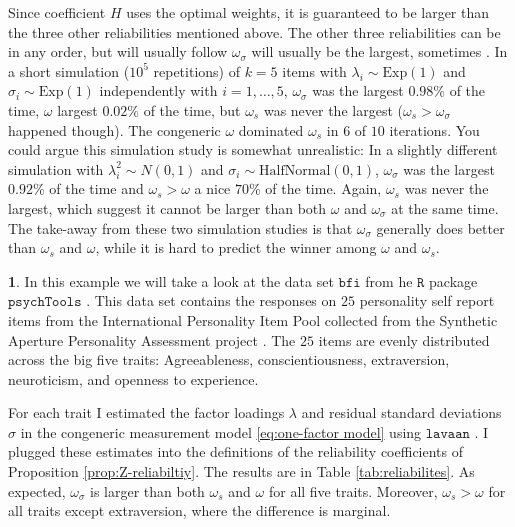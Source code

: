 \documentclass{article}
\theoremstyle{plain}
\theoremstyle{plain}
\theoremstyle{definition}
\theoremstyle{remark}
\theoremstyle{definition}
\newtheorem{example}[thm]{\protect\examplename}
\theoremstyle{plain}
\theoremstyle{plain}
\theoremstyle{definition}
\providecommand{\examplename}{Example}
\begin{document}
Since coefficient $H$ uses the optimal weights, it is guaranteed to
be larger than the three other reliabilities mentioned above. The
other three reliabilities can be in any order, but will usually follow
$\omega_{\sigma}$ will usually be the largest, sometimes . In a short
simulation ($10^{5}$ repetitions) of $k=5$ items with $\lambda_{i}\sim \textrm{Exp}(1)$
and $\sigma_{i}\sim \textrm{Exp}(1)$ independently with $i=1,\ldots,5$, $\omega_{\sigma}$
was the largest $0.98\%$ of the time, $\omega$ largest $0.02\%$
of the time, but $\omega_{s}$ was never the largest ($\omega_{s}>\omega_{\sigma}$
happened though). The congeneric $\omega$ dominated $\omega_{s}$
in $6$ of $10$ iterations. You could argue this simulation study
is somewhat unrealistic: In a slightly different simulation with $\lambda_{i}^{2}\sim N(0,1)$
and $\sigma_{i}\sim \textrm{HalfNormal}(0,1)$, $\omega_{\sigma}$ was the
largest $0.92\%$ of the time and $\omega_{s}>\omega$ a nice $70\%$
of the time. Again, $\omega_{s}$ was never the largest, which suggest
it cannot be larger than both $\omega$ and $\omega_{\sigma}$ at
the same time. The take-away from these two simulation studies is
that $\omega_{\sigma}$ generally does better than $\omega_{s}$ and
$\omega$, while it is hard to predict the winner among $\omega$
and $\omega_{s}$. 

\begin{example}


In this example we will take a look at the data set $\texttt{bfi}$ from he $\texttt{R}$ \citep{Team2013-tt} package $\texttt{psychTools}$ \citep{Revelle2019-te}. This data set contains the responses on $25$ personality self report items from the International Personality Item Pool \citep{Goldberg1999-iz} collected from the Synthetic Aperture Personality Assessment project \citep{Revelle2016-ez}. The $25$ items are evenly distributed across the big five traits: Agreeableness, conscientiousness, extraversion, neuroticism, and openness to experience. 

For each trait I estimated the factor loadings $\lambda$ and residual standard deviations $\sigma$ in the congeneric measurement model \eqref{eq:one-factor model} using  $\texttt{lavaan}$ \citep{Rosseel2012-yg}. I plugged these estimates into the definitions of the reliability coefficients of Proposition \ref{prop:Z-reliabiltiy}. The results are in Table \ref{tab:reliabilites}. As expected, $\omega_\sigma$ is larger than both $\omega_s$ and $\omega$ for all five traits. Moreover, $\omega_s > \omega$ for all traits except extraversion, where the difference is marginal. 
\end{example}
\end{document}

